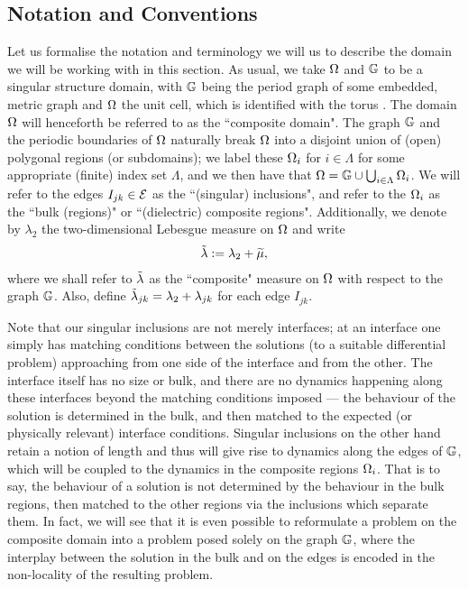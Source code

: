 \subsection{Notation and Conventions} \label{ssec:SINotation}
Let us formalise the notation and terminology we will us to describe the domain we will be working with in this section.
As usual, we take $\Omega$ and $\mathbb{G}$ to be a singular structure domain, with $\mathbb{G}$ being the period graph of some embedded, metric graph and $\Omega$ the unit cell, which is identified with the torus .
The domain $\Omega$ will henceforth be referred to as the ``composite domain".
The graph $\mathbb{G}$ and the periodic boundaries of $\Omega$ naturally break $\Omega$ into a disjoint union of (open) polygonal regions (or subdomains); we label these $\Omega_i$ for $i\in\Lambda$ for some appropriate (finite) index set $\Lambda$, and we then have that $\Omega = \mathbb{G}\cup\bigcup_{i\in\Lambda}\Omega_i$.
We will refer to the edges $I_{jk}\in\mathcal{E}$ as the ``(singular) inclusions", and refer to the $\Omega_i$ as the ``bulk (regions)" or ``(dielectric) composite regions".
Additionally, we denote by $\lambda_2$ the two-dimensional Lebesgue measure on $\Omega$ and write
\begin{align*}
	\tilde{\lambda} := \lambda_2 + \widetilde{\mu},
\end{align*}
where we shall refer to $\tilde{\lambda}$ as the ``composite" measure on $\Omega$ with respect to the graph $\mathbb{G}$.
Also, define $\tilde{\lambda}_{jk} = \lambda_2 + \lambda_{jk}$ for each edge $I_{jk}$.

Note that our singular inclusions are not merely interfaces; at an interface one simply has matching conditions between the solutions (to a suitable differential problem) approaching from one side of the interface and from the other.
The interface itself has no size or bulk, and there are no dynamics happening along these interfaces beyond the matching conditions imposed --- the behaviour of the solution is determined in the bulk, and then matched to the expected (or physically relevant) interface conditions.
Singular inclusions on the other hand retain a notion of length and thus will give rise to dynamics along the edges of $\mathbb{G}$, which will be coupled to the dynamics in the composite regions $\Omega_i$.
That is to say, the behaviour of a solution is not determined by the behaviour in the bulk regions, then matched to the other regions via the inclusions which separate them.
In fact, we will see that it is even possible to reformulate a problem on the composite domain into a problem posed solely on the graph $\mathbb{G}$, where the interplay between the solution in the bulk and on the edges is encoded in the non-locality of the resulting problem.